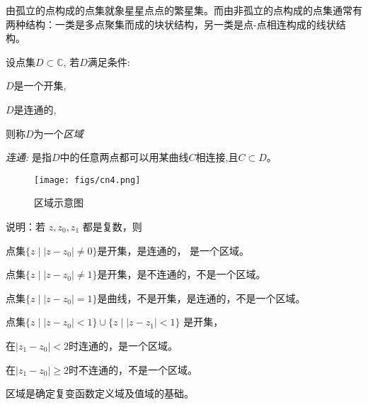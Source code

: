 由孤立的点构成的点集就象星星点点的繁星集。而由非孤立的点构成的点集通常有两种结构：一类是多点聚集而成的块状结构，另一类是点-点相连构成的线状结构。
\begin{definition}\label{}\index{}
	设点集$D \subset \mathbb{C}$, 若$D$满足条件: 
    \begin{inparaenum} [(i)]
        \item $D$是一个开集,
        \item $D$是连通的,
    \end{inparaenum}
    则称$D$为一个\emph{区域} 

    \emph{连通: }是指$D$中的任意两点都可以用某曲线$C$相连接,且$C \subset D$。
    \begin{figure}[htbp]
        \centering
        \texttt{[image: figs/cn4.png]}
        \caption{区域示意图}
      \end{figure} 
\end{definition}
说明：若 $z, z_0, z_1$ 都是复数，则
\begin{compactitem}
    \item 点集$\{z  \mid |z- z_0| \ne 0 \}$是开集，是连通的， 是一个区域。
    \item 点集$\{z  \mid |z - z_0| \ne 1 \}$是开集，是不连通的，不是一个区域。
    \item 点集$\{z  \mid |z - z_0| = 1 \}$是曲线，不是开集，是连通的，不是一个区域。
    \item 点集$\{z  \mid |z-z_0| < 1 \} \cup \{z  \mid |z-z_1| < 1 \} $ 是开集，\\
    \begin{inparaenum}[(a)]
        \item 在$|z_1 -z_0| < 2$时连通的，是一个区域。
        \item 在$|z_1 -z_0| \ge 2$时不连通的，不是一个区域。 
    \end{inparaenum} 
    \item 区域是确定复变函数定义域及值域的基础。
\end{compactitem}

